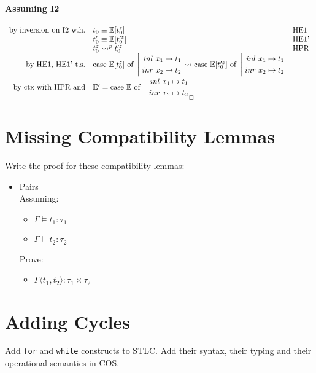 \documentclass{article}
\newcommand{\inl}[0]{\ensuremath{\ inl\ }}
\newcommand{\inr}[0]{\ensuremath{\ inr\ }}
\newcommand{\case}[3]{\ensuremath{\text{case}#1\ \text{of}\ \left|\begin{aligned}#2\\#3\end{aligned}\right.}}
\newcommand{\mE}[0]{\ensuremath{\mathbb{E}}}
\begin{document}
\paragraph{Assuming I2}
\[
    \begin{array}{rl @{\quad} l}
        \text{by inversion on I2 w.h.}   &  t_0  \equiv \mE[t_0^z]         & \text{HE1}\\
                                         &  t_0' \equiv \mE[t_0'^z]        & \text{HE1'}\\
                                         &  t_0^z \leadsto^p t_0'^z     & \text{HPR}\\
        \text{by HE1, HE1' t.s.}         &  \case{\ \mE[t_0^z]}{\inl x_1 \mapsto t_1}{\inr x_2 \mapsto t_2} \leadsto \case{\ \mE[t_0'^z]}{\inl x_1 \mapsto t_1}{\inr x_2 \mapsto t_2} \\
        \text{by ctx with HPR and}       &  \mE' = \case{\ \mE}{\inl x_1 \mapsto t_1}{\inr x_2 \mapsto t_2} _\square \\
    \end{array}
\]


\section{Missing Compatibility Lemmas}
Write the proof for these compatibility lemmas:
\begin{itemize}
    \item Pairs \\
        Assuming: \begin{itemize}
            \item $\Gamma \vDash t_1:\tau_1$
            \item $\Gamma \vDash t_2:\tau_2$
        \end{itemize}
        Prove: \begin{itemize}
            \item $\Gamma \langle t_1,t_2 \rangle : \tau_1\times\tau_2$
        \end{itemize}
\end{itemize}

\section{Adding Cycles}
Add \texttt{for} and \texttt{while} constructs to STLC. Add their syntax, their typing and their operational
semantics in COS.
\end{document}
